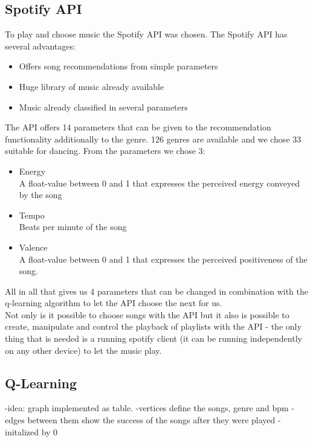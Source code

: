 \documentclass{article}
\begin{document}
\subsection{Spotify API}

To play and choose music the Spotify API was chosen. The Spotify API has several advantages:
\begin{itemize}
    \item Offers song recommendations from simple parameters
    \item Huge library of music already available
    \item Music already classified in several parameters
\end{itemize}
The API offers 14 parameters that can be given to the recommendation functionality additionally to the genre. 126 genres are available and we chose 33 suitable for dancing. From the parameters we chose 3:
\begin{itemize}
    \item Energy\\
        A float-value between 0 and 1 that expresses the perceived energy conveyed by the song
    \item Tempo\\
        Beats per minute of the song
    \item Valence\\
        A float-value between 0 and 1 that expresses the perceived positiveness of the song.
\end{itemize}
All in all that gives us 4 parameters that can be changed in combination with the q-learning algorithm to let the API choose the next for us. \\
Not only is it possible to choose songs with the API but it also is possible to create, manipulate and control the playback of playlists with the API - the only thing that is needed is a running spotify client (it can be running independently on any other device) to let the music play.

\subsection{Q-Learning}

-idea: graph implemented as table.
-vertices define the songs, genre and bpm
-edges between them show the success of the songs after they were played
-initalized by 0
\end{document}
